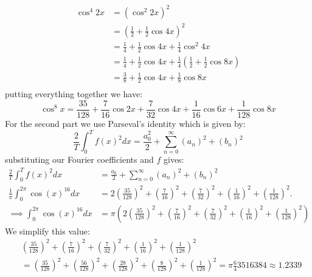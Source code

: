 \documentclass[11pt]{article}
\begin{document}
\begin{solution}
\begin{align*}
\end{align*}
\begin{align*}
    \cos^4 2x &= (\cos^2 2x)^2\\
    &=(\frac 1 2 + \frac 1 2 \cos 4x)^2\\
    &= \frac 1 4 + \frac 1 2 \cos 4x + \frac 1 4 \cos^2 4x\\
    &= \frac 1 4 + \frac 1 2 \cos 4x + \frac 1 4 (\frac 1 2 + \frac 1 2 \cos 8x)\\
    &= \frac 3 8 + \frac 1 2 \cos 4x + \frac 1 8 \cos 8x\\
\end{align*}
putting everything together we have:
\[
    \cos^8x  = \frac{35}{128} + \frac{7}{16}\cos 2x + \frac{7}{32}\cos 4x + \frac{1}{16} \cos 6x + \frac{1}{128}\cos 8x
\]
For the second part we use Parseval's identity which is given by: 
\[
    \frac{2}{T} \int_0^T f(x)^2 d x= \frac{a_0^2}{2}+\sum_{n=0}^{\infty}\left(a_n\right)^2+\left(b_n\right)^2
\]
substituting our Fourier coefficients and $f$ gives: 
\begin{align*}
    \frac{2}{T} \int_0^T f(x)^2 d x&= \frac{a_0}{2}+\sum_{n=0}^{\infty}\left(a_n\right)^2+\left(b_n\right)^2\\
    \frac{1}{\pi} \int_0^{2\pi} \cos(x)^{16} d x&= 2\left(\frac{35}{128}\right)^2 + \left(\frac{7}{16}\right)^2 + \left(\frac{7}{32}\right)^2 + \left(\frac{1}{16}\right)^2 + \left(\frac{1}{128}\right)^2.\\
    \implies \int_0^{2\pi} \cos(x)^{16} d x&= \pi\left(2\left(\frac{35}{128}\right)^2 + \left(\frac{7}{16}\right)^2 + \left(\frac{7}{32}\right)^2 + \left(\frac{1}{16}\right)^2 + \left(\frac{1}{128}\right)^2\right)
\end{align*}
We simplify this value:
\begin{align*}
    &
    \left(\frac{35}{128}\right)^2 
    + 
    \left(\frac{7}{16}\right)^2 
    + 
    \left(\frac{7}{32}\right)^2 
    + 
    \left(\frac{1}{16}\right)^2 
    + 
    \left(\frac{1}{128}\right)^2
    \\&
    =
    \left(\frac{35}{128}\right)^2 
    + 
    \left(\frac{56}{128}\right)^2 
    + 
    \left(\frac{28}{128}\right)^2 
    + 
    \left(\frac{8}{128}\right)^2 
    + 
    \left(\frac{1}{128}\right)^2
    = 
    \pi\frac 6435 16384 \approx 1.2339
\end{align*}
\end{solution}
\end{document}

